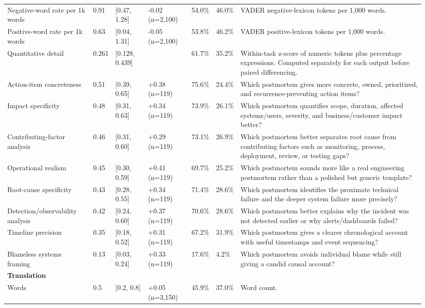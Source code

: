 \begin{longtable}{lllllll}
Negative-word rate per 1k words & 0.91 & [0.47, 1.28] & -0.02 (n=2,100) & 54.0\% & 46.0\% & VADER negative-lexicon tokens per 1,000 words. \\
Positive-word rate per 1k words & 0.63 & [0.04, 1.31] & -0.05 (n=2,100) & 53.8\% & 46.2\% & VADER positive-lexicon tokens per 1,000 words. \\
Quantitative detail & 0.261 & [0.128, 0.439] &  & 61.7\% & 35.2\% & Within-task z-score of numeric tokens plus percentage expressions. Computed separately for each output before paired differencing. \\
Action-item concreteness & 0.51 & [0.39, 0.65] & +0.38 (n=119) & 75.6\% & 24.4\% & Which postmortem gives more concrete, owned, prioritized, and recurrence-preventing action items? \\
Impact specificity & 0.48 & [0.31, 0.63] & +0.34 (n=119) & 73.9\% & 26.1\% & Which postmortem quantifies scope, duration, affected systems/users, severity, and business/customer impact better? \\
Contributing-factor analysis & 0.46 & [0.31, 0.60] & +0.29 (n=119) & 73.1\% & 26.9\% & Which postmortem better separates root cause from contributing factors such as monitoring, process, deployment, review, or testing gaps? \\
Operational realism & 0.45 & [0.30, 0.59] & +0.41 (n=119) & 69.7\% & 25.2\% & Which postmortem sounds more like a real engineering postmortem rather than a polished but generic template? \\
Root-cause specificity & 0.43 & [0.28, 0.55] & +0.34 (n=119) & 71.4\% & 28.6\% & Which postmortem identifies the proximate technical failure and the deeper system failure more precisely? \\
Detection/observability analysis & 0.42 & [0.24, 0.60] & +0.37 (n=119) & 70.6\% & 28.6\% & Which postmortem better explains why the incident was not detected earlier or why alerts/dashboards failed? \\
Timeline precision & 0.35 & [0.18, 0.52] & +0.31 (n=119) & 67.2\% & 31.9\% & Which postmortem gives a clearer chronological account with useful timestamps and event sequencing? \\
Blameless systems framing & 0.13 & [0.03, 0.24] & +0.33 (n=119) & 17.6\% & 4.2\% & Which postmortem avoids individual blame while still giving a candid causal account? \\
\multicolumn{7}{l}{\textbf{Translation}} \\
Words & 0.5 & [0.2, 0.8] & +0.05 (n=3,150) & 45.9\% & 37.0\% & Word count. \\

\end{longtable}
